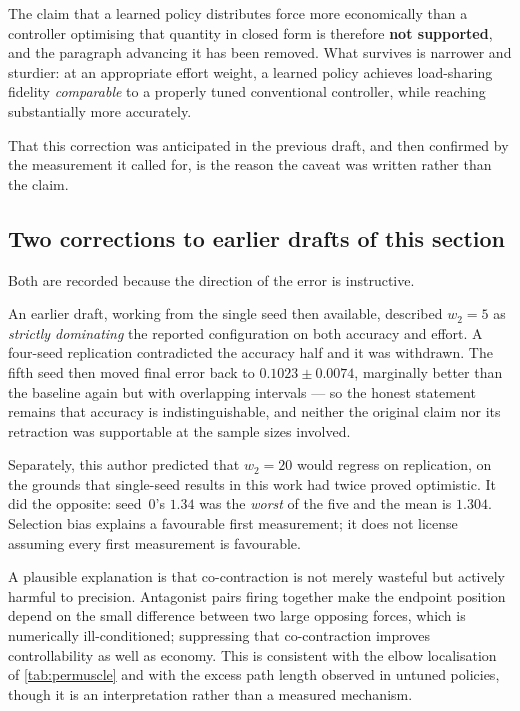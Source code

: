 The claim that a learned policy distributes force more economically than a
controller optimising that quantity in closed form is therefore \textbf{not
supported}, and the paragraph advancing it has been removed. What survives is
narrower and sturdier: at an appropriate effort weight, a learned policy achieves
load-sharing fidelity \emph{comparable} to a properly tuned conventional
controller, while reaching substantially more accurately.

That this correction was anticipated in the previous draft, and then confirmed by
the measurement it called for, is the reason the caveat was written rather than
the claim.

\subsection{Two corrections to earlier drafts of this section}

Both are recorded because the direction of the error is instructive.

An earlier draft, working from the single seed then available, described
$w_2 = 5$ as \emph{strictly dominating} the reported configuration on both
accuracy and effort. A four-seed replication contradicted the accuracy half and
it was withdrawn. The fifth seed then moved final error back to
$0.1023 \pm 0.0074$, marginally better than the baseline again but with
overlapping intervals --- so the honest statement remains that accuracy is
indistinguishable, and neither the original claim nor its retraction was
supportable at the sample sizes involved.

Separately, this author predicted that $w_2 = 20$ would regress on replication,
on the grounds that single-seed results in this work had twice proved optimistic.
It did the opposite: seed~0's $1.34$ was the \emph{worst} of the five and the
mean is $1.304$. Selection bias explains a favourable first measurement; it does
not license assuming every first measurement is favourable.

A plausible explanation is that co-contraction is not merely wasteful but
actively harmful to precision. Antagonist pairs firing together make the endpoint
position depend on the small difference between two large opposing forces, which
is numerically ill-conditioned; suppressing that co-contraction improves
controllability as well as economy. This is consistent with the elbow
localisation of \cref{tab:permuscle} and with the excess path length observed in
untuned policies, though it is an interpretation rather than a measured
mechanism.

